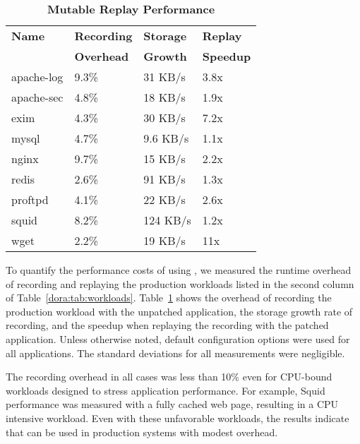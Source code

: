 \begin{table}[t]
  \centering
\begin{tabular}{llll}   \toprule
  {\bf Name}   & {\bf Recording } & {\bf Storage } & {\bf Replay } \\
               & {\bf Overhead}   & {\bf Growth}   & {\bf Speedup} \\ \midrule
		apache-log & 9.3\%            & 31 KB/s        & 3.8x          \\
		apache-sec & 4.8\%            & 18 KB/s        & 1.9x          \\
		exim       & 4.3\%            & 30 KB/s        & 7.2x          \\
		mysql      & 4.7\%            & 9.6 KB/s       & 1.1x          \\
		nginx      & 9.7\%            & 15 KB/s        & 2.2x          \\
		redis      & 2.6\%            & 91 KB/s        & 1.3x          \\
		proftpd    & 4.1\%            & 22 KB/s        & 2.6x          \\
		squid      & 8.2\%            & 124 KB/s       & 1.2x          \\
		wget       & 2.2\%            & 19 KB/s        & 11x           \\
\bottomrule
\end{tabular}
\caption{{\bf Mutable Replay Performance}}
\label{dora:tab:performance}
\end{table}

To quantify the performance costs of using {\dora}, we measured the
runtime overhead of recording and replaying the production workloads 
listed in the second column of Table~\ref{dora:tab:workloads}.
Table~\ref{dora:tab:performance} shows the overhead of recording the
production workload with the unpatched application,
the storage growth rate of recording, and the
speedup when replaying the recording with the patched application.
Unless otherwise noted, default configuration options were used for
all applications.  The standard deviations for all measurements were
negligible.

The recording overhead in all cases was less than
10\% even for CPU-bound workloads designed to stress application
performance. For example, Squid performance was measured with a fully
cached web page, resulting in a CPU
intensive workload. Even with these unfavorable workloads, the results indicate
that {\dora} can be used in production systems with modest overhead.

